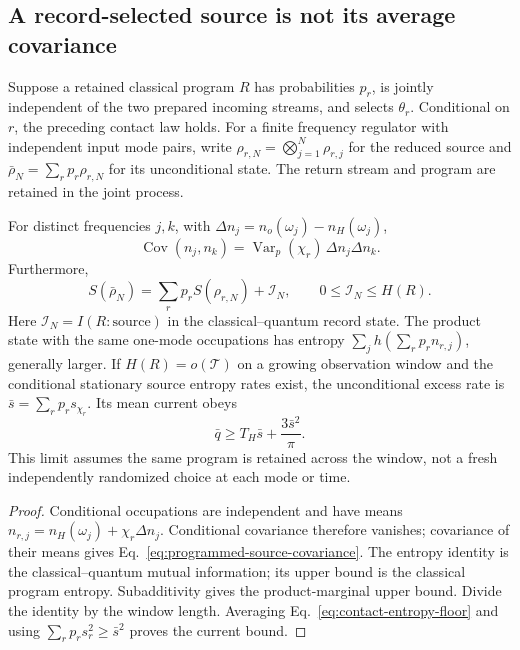 \subsection{A record-selected source is not its average covariance}
\label{sec:programmed-source}

Suppose a retained classical program $R$ has probabilities $p_r$, is
jointly independent of the two prepared incoming streams, and selects
$\theta_r$. Conditional on $r$, the preceding contact law holds.
For a finite frequency regulator with independent input mode pairs,
write $\rho_{r,N}=\bigotimes_{j=1}^N\rho_{r,j}$ for the reduced source
and $\bar\rho_N=\sum_rp_r\rho_{r,N}$ for its unconditional state.
The return stream and program are retained in the joint process.

\begin{proposition}
\label{prop:programmed-source}
For distinct frequencies $j,k$, with $\Delta n_j=n_o(\omega_j)-n_H(\omega_j)$,
\begin{equation}\label{eq:programmed-source-covariance}
 \operatorname{Cov}(n_j,n_k)=
 \operatorname{Var}_p(\chi_r)\,\Delta n_j\Delta n_k.
\end{equation}
Furthermore,
\begin{equation}\label{eq:programmed-source-entropy}
 S(\bar\rho_N)=\sum_rp_r S(\rho_{r,N})+\mathcal I_N,
 \qquad 0\le\mathcal I_N\le H(R).
\end{equation}
Here $\mathcal I_N=I(R:\text{source})$ in the classical--quantum
record state. The product state with the same one-mode occupations
has entropy $\sum_jh(\sum_rp_r n_{r,j})$, generally larger.
If $H(R)=o(\mathcal T)$ on a growing observation window and the
conditional stationary source entropy rates exist, the unconditional
excess rate is $\bar s=\sum_rp_r s_{\chi_r}$. Its mean current obeys
\[
 \bar q\ge T_H\bar s+\frac{3\bar s^2}{\pi}.
\]
This limit assumes the same program is retained across the window,
not a fresh independently randomized choice at each mode or time.
\end{proposition}
\begin{proof}
Conditional occupations are independent and have means
$n_{r,j}=n_H(\omega_j)+\chi_r\Delta n_j$. Conditional covariance
therefore vanishes; covariance of their means gives
Eq.~\eqref{eq:programmed-source-covariance}.
The entropy identity is the classical--quantum mutual information;
its upper bound is the classical program entropy. Subadditivity
gives the product-marginal upper bound. Divide the identity by the
window length. Averaging Eq.~\eqref{eq:contact-entropy-floor} and
using $\sum_rp_rs_r^2\ge\bar s^2$ proves the current bound.
\end{proof}

